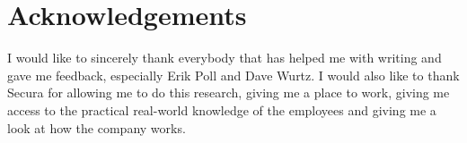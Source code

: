 \chapter*{Acknowledgements}
I would like to sincerely thank everybody that has helped me with writing and gave me feedback, especially Erik Poll and Dave Wurtz. I would also like to thank Secura for allowing me to do this research, giving me a place to work, giving me access to the practical real-world knowledge of the employees and giving me a look at how the company works.

